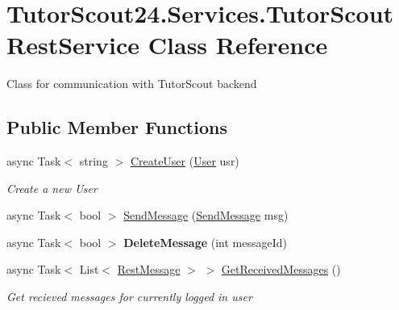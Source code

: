 \hypertarget{class_tutor_scout24_1_1_services_1_1_tutor_scout_rest_service}{}\section{Tutor\+Scout24.\+Services.\+Tutor\+Scout\+Rest\+Service Class Reference}
\label{class_tutor_scout24_1_1_services_1_1_tutor_scout_rest_service}


Class for communication with Tutor\+Scout backend  


\subsection*{Public Member Functions}
\begin{DoxyCompactItemize}
\item 
async Task$<$ string $>$ \mbox{\hyperlink{class_tutor_scout24_1_1_services_1_1_tutor_scout_rest_service_ac044899ad494ff54cd90ad36f038b993}{Create\+User}} (\mbox{\hyperlink{class_tutor_scout24_1_1_models_1_1_user_data_1_1_user}{User}} usr)
\begin{DoxyCompactList}\small\item\em Create a new User \end{DoxyCompactList}\item 
async Task$<$ bool $>$ \mbox{\hyperlink{class_tutor_scout24_1_1_services_1_1_tutor_scout_rest_service_aaccc0997a181be6e1076fc74b433ab80}{Send\+Message}} (\mbox{\hyperlink{class_tutor_scout24_1_1_models_1_1_chat_1_1_send_message}{Send\+Message}} msg)
\item 
\mbox{\label{class_tutor_scout24_1_1_services_1_1_tutor_scout_rest_service_ae48165852bad47c2a312a392e413e846}} 
async Task$<$ bool $>$ {\bfseries Delete\+Message} (int message\+Id)
\item 
async Task$<$ List$<$ \mbox{\hyperlink{class_tutor_scout24_1_1_models_1_1_chat_1_1_rest_message}{Rest\+Message}} $>$ $>$ \mbox{\hyperlink{class_tutor_scout24_1_1_services_1_1_tutor_scout_rest_service_a57ffeca07f199af8f3c5ca8bf8a34b35}{Get\+Received\+Messages}} ()
\begin{DoxyCompactList}\small\item\em Get recieved messages for currently logged in user \end{DoxyCompactList}\item 

\end{DoxyCompactItemize}

